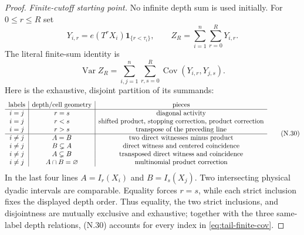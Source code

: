 \documentclass[11pt]{article}
\numberwithin{equation}{section}
\newcommand{\Var}{\operatorname{Var}}\newcommand{\Cov}{\operatorname{Cov}}
\newcommand{\1}{\mathbf 1}\newcommand{\F}{\mathcal F}\newcommand{\D}{\mathcal D}
\begin{document}
\begin{proof}
\emph{Finite-cutoff starting point.}
No infinite depth sum is used initially.  For $0\le r\le R$ set
\[
 Y_{i,r}=e(T^rX_i)\1_{\{r<\tau_i\}},\qquad
 Z_R=\sum_{i=1}^n\sum_{r=0}^RY_{i,r}.
\]
The literal finite-sum identity is
\begin{equation}\label{eq:tail-finite-cov}
 \Var Z_R=\sum_{i,j=1}^n\sum_{r,s=0}^R
 \Cov(Y_{i,r},Y_{j,s}).
\end{equation}
Here is the exhaustive, disjoint partition of its summands:
\[
\begin{array}{c|c|c}
\hbox{labels}&\hbox{depth/cell geometry}&\hbox{pieces} \\ \hline
 i=j&r=s&\hbox{diagonal activity} \\
 i=j&r<s&\hbox{shifted product, stopping correction, product correction} \\
 i=j&r>s&\hbox{transpose of the preceding line} \\ \hline
 i\ne j&A=B&\hbox{two direct witnesses minus product} \\
 i\ne j&B\subsetneq A&\hbox{direct witness and centered coincidence} \\
 i\ne j&A\subsetneq B&\hbox{transposed direct witness and coincidence} \\
 i\ne j&A\cap B=\varnothing&\hbox{multinomial product correction} \\
\end{array}                                                    \tag{N.30}
\]
In the last four lines $A=I_r(X_i)$ and $B=I_s(X_j)$.  Two intersecting
physical dyadic intervals are comparable.  Equality forces $r=s$, while
each strict inclusion fixes the displayed depth order.  Thus equality, the
two strict inclusions, and disjointness are mutually exclusive and exhaustive;
together with the three same-label depth relations, (N.30) accounts for every
index in \eqref{eq:tail-finite-cov}.


\end{proof}
\end{document}
